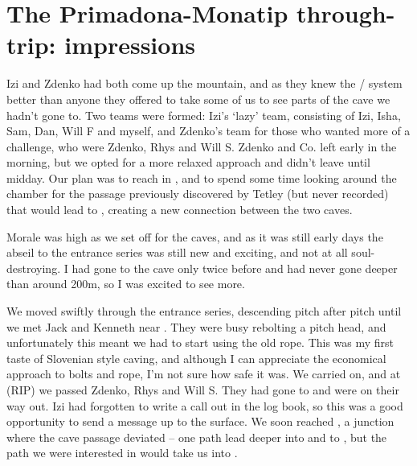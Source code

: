 \section{The Primadona-Monatip through-trip: impressions}



Izi and Zdenko had both come up the mountain, and as they knew the / system better than anyone they offered to take some of us to see parts of the cave we hadn't gone to. Two teams were formed: Izi's `lazy' team, consisting of Izi, Isha, Sam, Dan, Will F and myself, and Zdenko's team for those who wanted more of a challenge, who were Zdenko, Rhys and Will S. Zdenko and Co. left early in the morning, but we opted for a more relaxed approach and didn't leave until midday. Our plan was to reach  in , and to spend some time looking around the chamber for the passage previously discovered by Tetley (but never recorded) that would lead to , creating a new connection between the two caves.

Morale was high as we set off for the caves, and as it was still early days the abseil to the entrance series was still new and exciting, and not at all soul-destroying. I had gone to the cave only twice before and had never gone deeper than around 200m, so I was excited to see more.


We moved swiftly through the entrance series, descending pitch after pitch until we met Jack and Kenneth near . They were busy rebolting a pitch head, and unfortunately this meant we had to start using the old rope. This was my first taste of Slovenian style caving, and although I can appreciate the economical approach to bolts and rope, I'm not sure how safe it was. We carried on, and at  (RIP) we passed Zdenko, Rhys and Will S. They had gone to  and were on their way out. Izi had forgotten to write a call out in the log book, so this was a good opportunity to send a message up to the surface. We soon reached , a junction where the cave passage deviated -- one path lead deeper into  and to , but the path we were interested in would take us into . 

